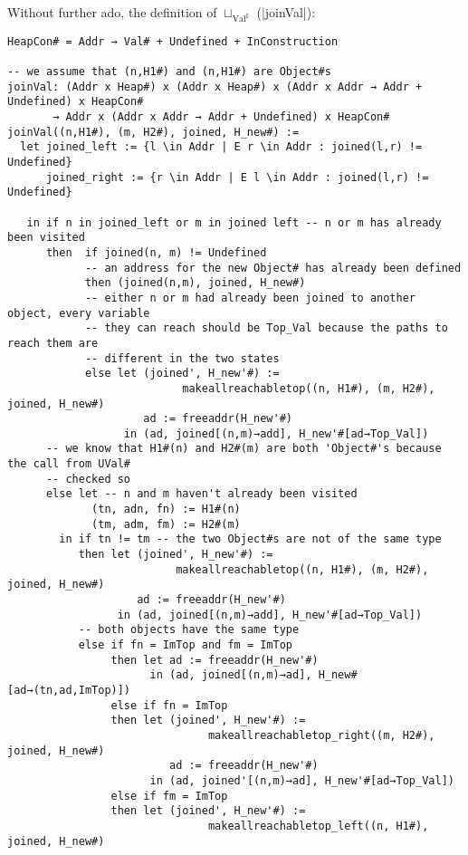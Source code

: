 Without further ado, the definition of \(\sqcup_{\text{Val}^\sharp}\) (\pycode|joinVal|):

\begin{verbatim}
HeapCon# = Addr → Val# + Undefined + InConstruction

-- we assume that (n,H1#) and (n,H1#) are Object#s
joinVal: (Addr x Heap#) x (Addr x Heap#) x (Addr x Addr → Addr + Undefined) x HeapCon#
       → Addr x (Addr x Addr → Addr + Undefined) x HeapCon#
joinVal((n,H1#), (m, H2#), joined, H_new#) :=
  let joined_left := {l \in Addr | E r \in Addr : joined(l,r) != Undefined}
      joined_right := {r \in Addr | E l \in Addr : joined(l,r) != Undefined}

   in if n in joined_left or m in joined left -- n or m has already been visited
      then  if joined(n, m) != Undefined
            -- an address for the new Object# has already been defined
            then (joined(n,m), joined, H_new#)
            -- either n or m had already been joined to another object, every variable
            -- they can reach should be Top_Val because the paths to reach them are
            -- different in the two states
            else let (joined', H_new'#) :=
                           makeallreachabletop((n, H1#), (m, H2#), joined, H_new#)
                     ad := freeaddr(H_new'#)
                  in (ad, joined[(n,m)→add], H_new'#[ad→Top_Val])
      -- we know that H1#(n) and H2#(m) are both 'Object#'s because the call from UVal#
      -- checked so
      else let -- n and m haven't already been visited
             (tn, adn, fn) := H1#(n)
             (tm, adm, fm) := H2#(m)
        in if tn != tm -- the two Object#s are not of the same type
           then let (joined', H_new'#) :=
                          makeallreachabletop((n, H1#), (m, H2#), joined, H_new#)
                    ad := freeaddr(H_new'#)
                 in (ad, joined[(n,m)→add], H_new'#[ad→Top_Val])
           -- both objects have the same type
           else if fn = ImTop and fm = ImTop
                then let ad := freeaddr(H_new'#)
                      in (ad, joined[(n,m)→ad], H_new#[ad→(tn,ad,ImTop)])
                else if fn = ImTop
                then let (joined', H_new'#) :=
                               makeallreachabletop_right((m, H2#), joined, H_new#)
                         ad := freeaddr(H_new'#)
                      in (ad, joined'[(n,m)→ad], H_new'#[ad→Top_Val])
                else if fm = ImTop
                then let (joined', H_new'#) :=
                               makeallreachabletop_left((n, H1#), joined, H_new#)

\end{verbatim}
